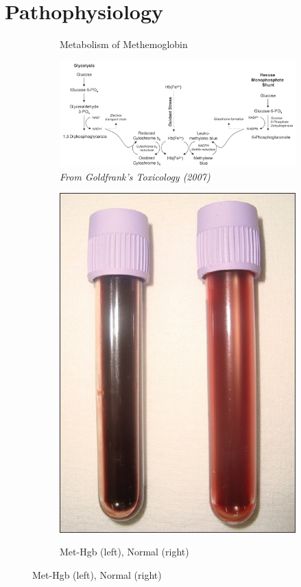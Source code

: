 \documentclass[main.tex]{subfiles}
\begin{document}
	
\section{Pathophysiology}
	
\begin{figure}[h!]
	\begin{subfigure}{0.75\textwidth}
		\raggedright
		\caption{Metabolism of Methemoglobin}
		\label{img:methgb-Metabolism}
		\includegraphics[width=\linewidth]{img/methemoglobinemia/metabolism.png}
		\caption*{\footnotesize \textit{From Goldfrank's Toxicology (2007)}}
	\end{subfigure}
	\hfill
	\begin{subfigure}{0.23\textwidth}
		\raggedleft
		\caption{Met-Hgb (left), Normal (right)}
		\label{img:methgb-picture}
		\includegraphics[width=\linewidth]{img/methemoglobinemia/blood.jpg}\\

\end{subfigure}
\end{figure}
\end{document}
